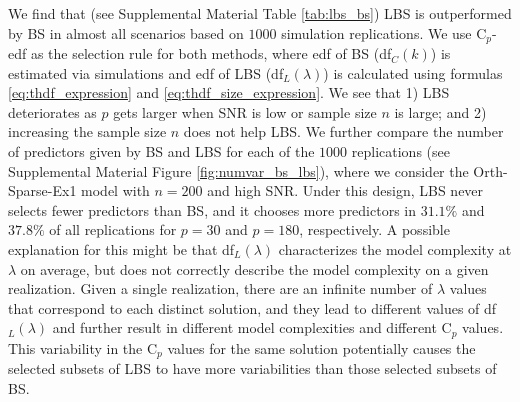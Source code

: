 We find that (see Supplemental Material Table \ref{tab:lbs_bs}) LBS is outperformed by BS in almost all scenarios based on $1000$ simulation replications. We use C$_p$-edf as the selection rule for both methods, where edf of BS (df$_C(k)$) is estimated via simulations and edf of LBS (df$_L(\lambda)$) is calculated using formulas \eqref{eq:thdf_expression} and \eqref{eq:thdf_size_expression}. We see that 1) LBS deteriorates as $p$ gets larger when SNR is low or sample size $n$ is large; and 2) increasing the sample size $n$ does not help LBS. We further compare the number of predictors given by BS and LBS for each of the $1000$ replications (see Supplemental Material Figure \ref{fig:numvar_bs_lbs}), where we consider the Orth-Sparse-Ex1 model with $n=200$ and high SNR. Under this design, LBS never selects fewer predictors than BS, and it chooses more predictors in $31.1\%$ and $37.8\%$ of all replications for $p=30$ and $p=180$, respectively. A possible explanation for this might be that df$_L(\lambda)$ characterizes the model complexity at $\lambda$ on average, but does not correctly describe the model complexity on a given realization. Given a single realization, there are an infinite number of $\lambda$ values that correspond to each distinct solution, and they lead to different values of df$_L(\lambda)$ and further result in different model complexities and different C$_p$ values. This variability in the C$_p$ values for the same solution potentially causes the selected subsets of LBS to have more variabilities than those selected subsets of BS. 





